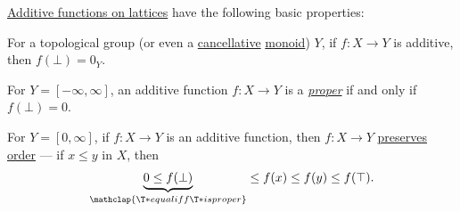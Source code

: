 \begin{proposition}\label{thm:def:boolean_algebra_additive_function}
  \hyperref[def:boolean_algebra_additive_function]{Additive functions on lattices} have the following basic properties:
  \begin{thmenum}
     For a topological group (or even a \hyperref[def:binary_operation/cancellative]{cancellative} \hyperref[def:monoid]{monoid}) \( Y \), if \( f: X \to Y \) is additive, then \( f(\bot) = 0_Y \).

     For \( Y = [-\infty, \infty] \), an additive function \( f: X \to Y \) is a \hyperref[def:effective_domain]{\emph{proper}} if and only if \( f(\bot) = 0 \).

     For \( Y = [0, \infty] \), if \( f: X \to Y \) is an additive function, then \( f: X \to Y \) \hyperref[def:order_function/preserving]{preserves order} --- if \( x \leq y \) in \( X \), then
    \begin{equation}\label{eq:thm:def:boolean_algebra_additive_function/nonnegative_order}
      \underbrace{0 \leq f(\bot)}_{\mathclap{\T*{equal if} f \T*{is proper}}} \leq f(x) \leq f(y) \leq f(\top).
    \end{equation}
  \end{thmenum}
\end{proposition}
